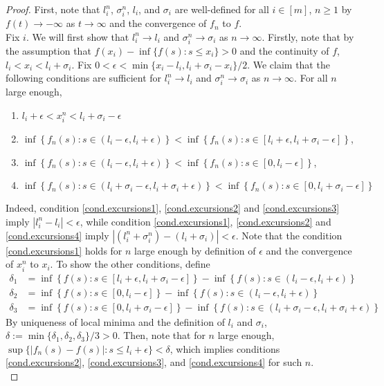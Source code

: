 \begin{proof}
First, note that $l_i^n$, $\sigma_i^n$, $l_i$, and $\sigma_i$ are well-defined for all $i\in [m]$, $n\geq 1$ by $f(t)\to -\infty$ as $t\to \infty$ and the convergence of $f_n$ to $f$. \\
Fix $i$. We will first show that $l^n_i\to l_i$ and $\sigma_i^n\to \sigma_i$ as $n\to \infty$. Firstly, note that by the assumption that $f(x_i)-\inf\{f(s):s\leq x_i\}>0$ and the continuity of $f$, $l_i<x_i<l_i+\sigma_i$. Fix $0<\epsilon<\min\{x_i-l_i,l_i+\sigma_i-x_i\}/2$. We claim that the following conditions are sufficient for $l^n_i\to l_i$ and $\sigma_i^n\to \sigma_i$ as $n\to \infty$. For all $n$ large enough,
\begin{enumerate}
    \item \label{cond.excursions1} $l_i+\epsilon<x^n_i<l_i+\sigma_i-\epsilon$
    \item \label{cond.excursions2}$\inf\left\{f_n(s):s\in (l_i-\epsilon, l_i+\epsilon)\right\}<\inf\left\{f_n(s):s\in [l_i+\epsilon,l_i+\sigma_i-\epsilon] \right\}$, 
    \item \label{cond.excursions3}$\inf\left\{f_n(s):s\in (l_i-\epsilon, l_i+\epsilon)\right\}<\inf\left\{f_n(s):s\in [0,l_i-\epsilon]\right\}$,
    \item \label{cond.excursions4} $\inf\left\{ f_n(s):s\in (l_i+\sigma_i-\epsilon,l_i+\sigma_i+\epsilon)\right\}<\inf\left\{f_n(s):s\in [0,l_i+\sigma_i-\epsilon]\right\}$
\end{enumerate}
Indeed, condition \ref{cond.excursions1}, \ref{cond.excursions2} and \ref{cond.excursions3} imply $|l^n_i-l_i|<\epsilon$, while condition \ref{cond.excursions1}, \ref{cond.excursions2} and \ref{cond.excursions4} imply $|(l^n_i+\sigma^n_i)-(l_i+\sigma_i)|<\epsilon$. Note that the condition \ref{cond.excursions1} holds for $n$ large enough by definition of $\epsilon$ and the convergence of $x_i^n$ to $x_i$. To show the other conditions, define
\begin{align*}\delta_1&=\inf\left\{f(s):s\in [l_i+\epsilon,l_i+\sigma_i-\epsilon]\right\}-\inf\left\{f(s):s\in (l_i-\epsilon,l_i+\epsilon)\right\}\\
\delta_2&=\inf\left\{f(s):s\in [0,l_i-\epsilon]\right\}-\inf\left\{f(s):s\in (l_i-\epsilon,l_i+\epsilon)\right\}\\
\delta_3&=\inf\left\{f(s):s\in [0,l_i+\sigma_i-\epsilon]\right\}-\inf\left\{f(s):s\in (l_i+\sigma_i-\epsilon,l_i+\sigma_i+\epsilon)\right\}
\end{align*}
By uniqueness of local minima and the definition of $l_i$ and $\sigma_i$,  $\delta:=\min\{\delta_1,\delta_2,\delta_3\}/3>0$. Then, note that for $n$ large enough, $\sup\{|f_n(s)-f(s)|:s\leq l_i+\epsilon\}<\delta$, which implies conditions \ref{cond.excursions2}, \ref{cond.excursions3}, and \ref{cond.excursions4} for such $n$. \\

\end{proof}
